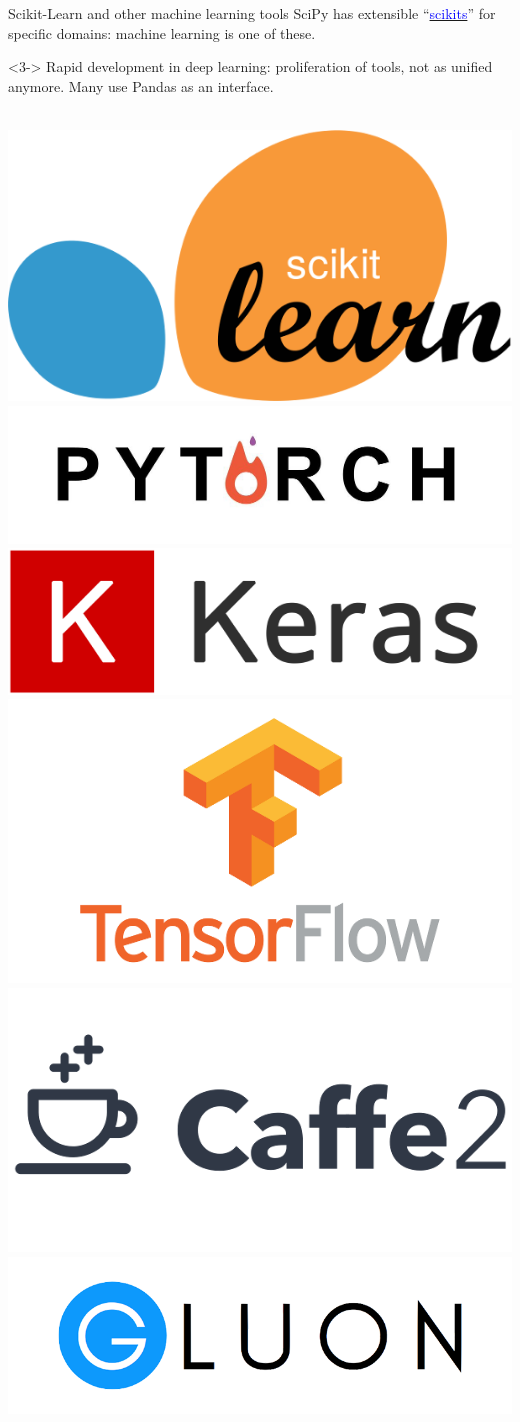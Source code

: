 \documentclass[aspectratio=169]{beamer}
\begin{document}
\begin{frame}{Scikit-Learn and other machine learning tools}
\vspace{0.5 cm}
SciPy has extensible ``\href{https://www.scipy.org/scikits.html}{\textcolor{blue}{scikits}}'' for specific domains: machine learning is one of these.

\vspace{0.25 cm}

\vspace{0.25 cm}
\begin{uncoverenv}<3->
Rapid development in deep learning: proliferation of tools, not as unified anymore. Many use Pandas as an interface.

\vspace{0.15 cm}
\mbox{ } \includegraphics[height=0.8 cm]{sklearn-logo.png}
\hfill \includegraphics[height=0.8 cm]{pytorch-logo.png}
\hfill \includegraphics[height=0.8 cm]{keras-logo.png}
\hfill \includegraphics[height=1 cm]{tensorflow-logo.png}
\hfill \includegraphics[height=0.8 cm]{caffe2-logo.png}
\hfill \includegraphics[height=0.8 cm]{gluon-logo.png} \mbox{ }


\end{uncoverenv}
\end{frame}
\end{document}
